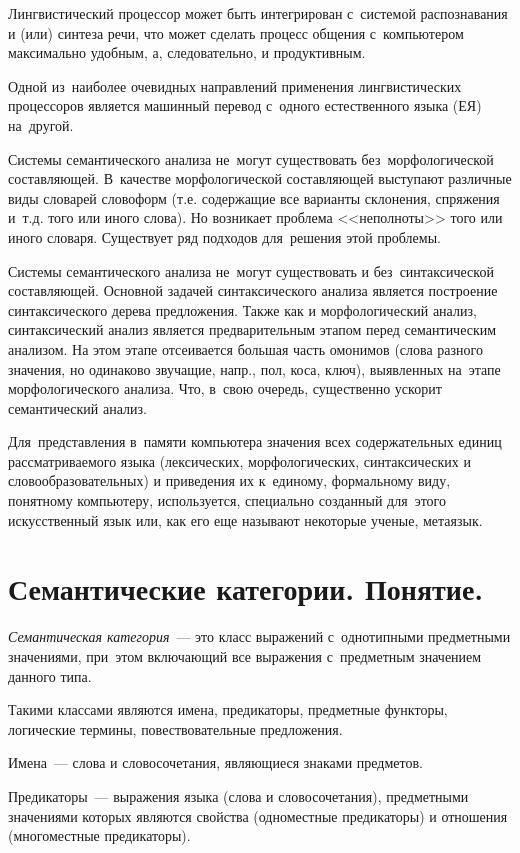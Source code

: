 \documentclass[12pt]{article}
\theoremstyle{definition}
\theoremstyle{remark}
\numberwithin{equation}{section}
\begin{document}
Лингвистический процессор может быть интегрирован с~системой распознавания
и (или) синтеза речи, что может сделать процесс общения с~компьютером
максимально удобным, а, следовательно, и продуктивным.

Одной из~наиболее очевидных направлений применения лингвистических
процессоров является машинный перевод с~одного естественного языка (ЕЯ)
на~другой.

Системы семантического анализа не~могут существовать без~морфологической
составляющей. В~качестве морфологической составляющей выступают различные
виды словарей словоформ (т.е. содержащие все варианты склонения, спряжения
и~т.д. того или иного слова). Но возникает проблема <<неполноты>> того или
иного словаря. Существует ряд подходов для~решения этой проблемы.

Системы семантического анализа не~могут существовать и без~синтаксической
составляющей. Основной задачей синтаксического анализа является построение
синтаксического дерева предложения. Также как и морфологический анализ,
синтаксический анализ является предварительным этапом перед семантическим
анализом. На этом этапе отсеивается большая часть омонимов (слова разного
значения, но одинаково звучащие, напр., пол, коса, ключ), выявленных на~этапе
морфологического анализа. Что, в~свою очередь, существенно ускорит
семантический анализ.

Для~представления в~памяти компьютера значения всех содержательных единиц
рассматриваемого языка (лексических, морфологических, синтаксических и
словообразовательных) и приведения их к~единому, формальному виду,
понятному компьютеру, используется, специально созданный для~этого
искусственный язык или, как его еще называют некоторые ученые, метаязык.

\section{Семантические категории. Понятие.}
{\sl Семантическая категория}~--- это класс выражений с~однотипными
предметными значениями, при~этом включающий все выражения с~предметным
значением данного типа.

Такими классами являются имена, предикаторы, предметные функторы,
логические термины, повествовательные предложения.

Имена~--- слова и словосочетания, являющиеся знаками предметов.

Предикаторы~--- выражения языка (слова и словосочетания), предметными
значениями которых являются свойства (одноместные предикаторы)
и отношения (многоместные предикаторы).
\end{document}

